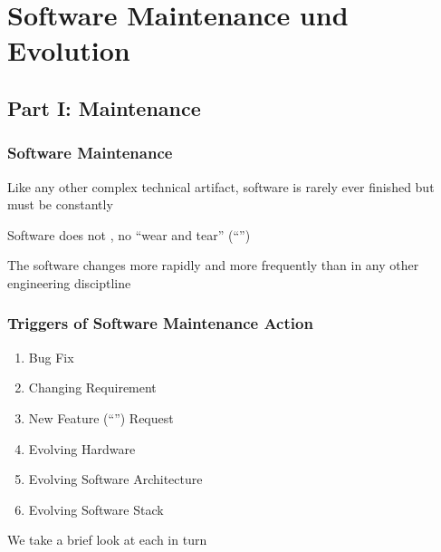 \section{Software Maintenance und Evolution}
\subsection{Part I: Maintenance}
\subsubsection*{Software Maintenance}
\begin{defBox}
    Like any other complex technical artifact, software is rarely ever finished but must be constantly 
\end{defBox}
\begin{defBox}
    Software does not , no \enquote{wear and tear} (\enquote{})
\end{defBox}
\begin{defBox}[title=However\, ...]
    The software  changes more rapidly and more frequently than in any other engineering disciptline
\end{defBox}
\subsubsection*{Triggers of Software Maintenance Action}
\begin{enumerate}
    \item Bug Fix
    \item Changing Requirement
    \item New Feature (\enquote{}) Request
    \item Evolving Hardware
    \item Evolving Software Architecture
    \item Evolving Software Stack
\end{enumerate}
\begin{defBox}
    We take a brief look at each in turn
\end{defBox}
